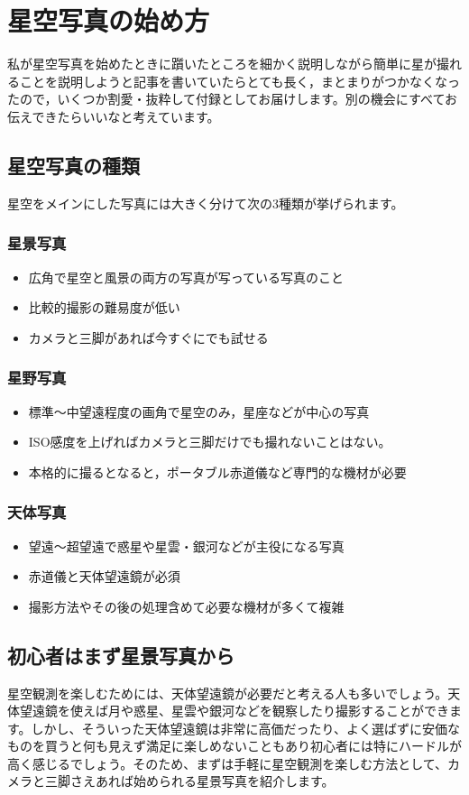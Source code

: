 \documentclass[../../super_nova_2023]{subfiles}
\begin{document}
\chapter{星空写真の始め方}
私が星空写真を始めたときに躓いたところを細かく説明しながら簡単に星が撮れることを説明しようと記事を書いていたらとても長く，まとまりがつかなくなったので，いくつか割愛・抜粋して付録としてお届けします。別の機会にすべてお伝えできたらいいなと考えています。
\section{星空写真の種類}
星空をメインにした写真には大きく分けて次の3種類が挙げられます。
\subsection{星景写真}
\begin{itemize}
	\item 広角で星空と風景の両方の写真が写っている写真のこと
	\item 比較的撮影の難易度が低い
	\item カメラと三脚があれば今すぐにでも試せる
\end{itemize}
\subsection{星野写真}
\begin{itemize}
	\item 標準～中望遠程度の画角で星空のみ，星座などが中心の写真
	\item ISO感度を上げればカメラと三脚だけでも撮れないことはない。
	\item 本格的に撮るとなると，ポータブル赤道儀など専門的な機材が必要
\end{itemize}
\subsection{天体写真}
\begin{itemize}
	\item 望遠～超望遠で惑星や星雲・銀河などが主役になる写真
	\item 赤道儀と天体望遠鏡が必須
	\item 撮影方法やその後の処理含めて必要な機材が多くて複雑
\end{itemize}
\section{初心者はまず星景写真から}
星空観測を楽しむためには、天体望遠鏡が必要だと考える人も多いでしょう。天体望遠鏡を使えば月や惑星、星雲や銀河などを観察したり撮影することができます。しかし、そういった天体望遠鏡は非常に高価だったり、よく選ばずに安価なものを買うと何も見えず満足に楽しめないこともあり初心者には特にハードルが高く感じるでしょう。そのため、まずは手軽に星空観測を楽しむ方法として、カメラと三脚さえあれば始められる星景写真を紹介します。
\end{document}
